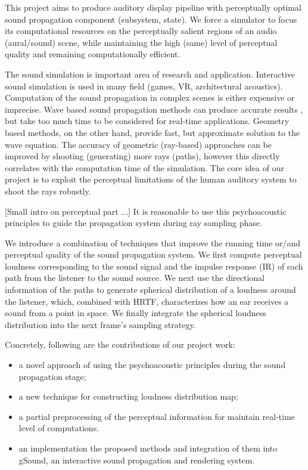 This project aims to produce auditory display pipeline with perceptually optimal sound propagation component (subsystem, state). We force a simulator to focus its computational resources on the perceptually salient regions of an audio (aural/sound) scene, while maintaining the high (same) level of perceptual quality and remaining computationally efficient.

The sound simulation is important area of research and application. Interactive sound simulation is used in many field (games, VR, architectural acoustics). Computation of the sound propagation in complex scenes is either expensive or imprecise. Wave based sound propagation methods can produce accurate results \cite{waves}, but take too much time to be considered for real-time applications. Geometry based methods, on the other hand, provide fast, but approximate solution to the wave equation. The accuracy of geometric (ray-based) approaches can be improved by shooting (generating) more rays (paths), however this directly correlates with the computation time of the simulation. The core idea of our project is to exploit the perceptual limitations of the human auditory system to shoot the rays robustly.

[Small intro on perceptual part ...] It is reasonable to use this psychoacoustic principles to guide the propagation system during ray sampling phase.

We introduce a combination of techniques that improve the running time or/and perceptual quality of the sound propagation system. We first compute perceptual loudness corresponding to the sound signal and the impulse response (IR) of each path from the listener to the sound source. We next use the directional information of the paths to generate spherical distribution of a loudness around the listener, which, combined with HRTF, characterizes how an ear receives a sound from a point in space. We finally integrate the spherical loudness distribution into the next frame's sampling strategy.

Concretely, following are the contributions of our project work:
\begin{itemize}
\item a novel approach of using the psychoacoustic principles during the sound propagation stage;
\item a new technique for constructing loudness distribution map;
\item a partial preprocessing of the perceptual information for maintain real-time level of computations. 
\item an implementation the proposed methods and integration of them into gSound, an interactive sound propagation and rendering system.
\end{itemize}

